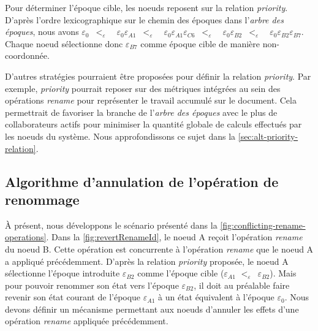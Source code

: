 \documentclass[12pt]{thesul}
\newcommand{\epoch}[1]{$\varepsilon_{#1}$}
\newcommand{\lepoch}{$<_{\varepsilon}$~}
\begin{document}
Pour déterminer l'époque cible, les noeuds reposent sur la relation \emph{priority}.
D'après l'ordre lexicographique sur le chemin des époques dans l'\emph{arbre des époques}, nous avons \epoch{0}~\lepoch~\epoch{0}\epoch{A1}~\lepoch~\epoch{0}\epoch{A1}\epoch{C6}~\lepoch~\epoch{0}\epoch{B2}~\lepoch~\epoch{0}\epoch{B2}\epoch{B7}.
Chaque noeud sélectionne donc \epoch{B7} comme époque cible de manière non-coordonnée.

D'autres stratégies pourraient être proposées pour définir la relation \emph{priority}.
Par exemple, \emph{priority} pourrait reposer sur des métriques intégrées au sein des opérations \emph{rename} pour représenter le travail accumulé sur le document.
Cela permettrait de favoriser la branche de l'\emph{arbre des époques} avec le plus de collaborateurs actifs pour minimiser la quantité globale de calculs effectués par les noeuds du système.
Nous approfondissons ce sujet dans la \autoref{sec:alt-priority-relation}.

\subsection{Algorithme d'annulation de l'opération de renommage}

\label{sec:reverting-rename-ops}

À présent, nous développons le scénario présenté dans la \autoref{fig:conflicting-rename-operations}.
Dans la \autoref{fig:revertRenameId}, le noeud A reçoit l'opération \emph{rename} du noeud B.
Cette opération est concurrente à l'opération \emph{rename} que le noeud A a appliqué précédemment.
D'après la relation \emph{priority} proposée, le noeud A sélectionne l'époque introduite \epoch{B2} comme l'époque cible (\epoch{A1} \lepoch \epoch{B2}).
Mais pour pouvoir renommer son état vers l'époque \epoch{B2}, il doit au préalable faire revenir son état courant de l'époque \epoch{A1} à un état équivalent à l'époque \epoch{0}.
Nous devons définir un mécanisme permettant aux noeuds d'annuler les effets d'une opération \emph{rename} appliquée précédemment.
\end{document}
